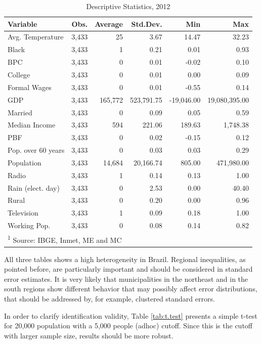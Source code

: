 \documentclass[12pt,]{article}
\begin{document}
\begin{table}[!h]

\caption{\label{tab:desc.2012}Descriptive Statistics, 2012}
\centering
\begin{tabular}{lrrrrr}
\toprule
Variable & Obs. & Average & Std.Dev. & Min & Max\\
\midrule
Avg. Temperature & 3,433 & 25 & 3.67 & 14.47 & 32.23\\
Black & 3,433 & 1 & 0.21 & 0.01 & 0.93\\
BPC & 3,433 & 0 & 0.01 & -0.02 & 0.10\\
College & 3,433 & 0 & 0.01 & 0.00 & 0.09\\
Formal Wages & 3,433 & 0 & 0.01 & -0.55 & 0.14\\
\addlinespace
GDP & 3,433 & 165,772 & 523,791.75 & -19,046.00 & 19,080,395.00\\
Married & 3,433 & 0 & 0.09 & 0.05 & 0.59\\
Median Income & 3,433 & 594 & 221.06 & 189.63 & 1,748.38\\
PBF & 3,433 & 0 & 0.02 & -0.15 & 0.12\\
Pop. over 60 years & 3,433 & 0 & 0.03 & 0.03 & 0.29\\
\addlinespace
Population & 3,433 & 14,684 & 20,166.74 & 805.00 & 471,980.00\\
Radio & 3,433 & 1 & 0.14 & 0.13 & 1.00\\
Rain (elect. day) & 3,433 & 0 & 2.53 & 0.00 & 40.40\\
Rural & 3,433 & 0 & 0.20 & 0.00 & 0.96\\
Television & 3,433 & 1 & 0.09 & 0.18 & 1.00\\
\addlinespace
Working Pop. & 3,433 & 0 & 0.08 & 0.14 & 0.82\\
\bottomrule
\multicolumn{6}{l}{\textsuperscript{1} Source: IBGE, Inmet, ME and MC}\\
\end{tabular}
\end{table}

All three tables shows a high heterogeneity in Brazil. Regional
inequalities, as pointed before, are particularly important and should
be considered in standard error estimates. It is very likely that
municipalities in the northeast and in the south regions show different
behavior that may possibly affect error distributions, that should be
addressed by, for example, clustered standard errors.

In order to clarify identification validity, Table \ref{tab:t.test}
presents a simple t-test for 20,000 population with a 5,000 people
(adhoc) cutoff. Since this is the cutoff with larger sample size,
results should be more robust.
\end{document}
